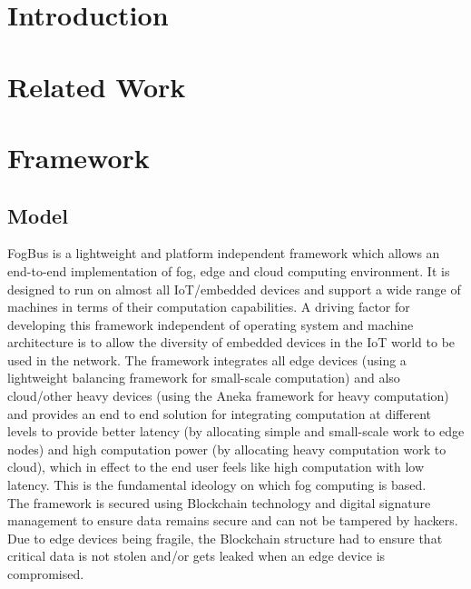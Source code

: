 \documentclass[10pt,journal,compsoc]{IEEEtran}
\begin{document}
%
\IEEEpeerreviewmaketitle

\section{Introduction}


\section{Related Work}

\clearpage

\section{Framework}

\subsection{Model}

FogBus is a lightweight and platform independent framework which allows an end-to-end implementation of fog, edge and cloud computing environment. It is designed to run on almost all IoT/embedded devices and support a wide range of machines in terms of their computation capabilities. A driving factor for developing this framework independent of operating system and machine architecture is to allow the diversity of embedded devices in the IoT world to be used in the network. The framework integrates all edge devices (using a lightweight balancing framework for small-scale computation) and also cloud/other heavy devices (using the Aneka framework for heavy computation) and provides an end to end solution for integrating computation at different levels to provide better latency (by allocating simple and small-scale work to edge nodes) and high computation power (by allocating heavy computation work to cloud), which in effect to the end user feels like high computation with low latency. This is the fundamental ideology on which fog computing is based.\\
The framework is secured using Blockchain technology and digital signature management to ensure data remains secure and can not be tampered by hackers. Due to edge devices being fragile, the Blockchain structure had to ensure that critical data is not stolen and/or gets leaked when an edge device is compromised. 
\end{document}
